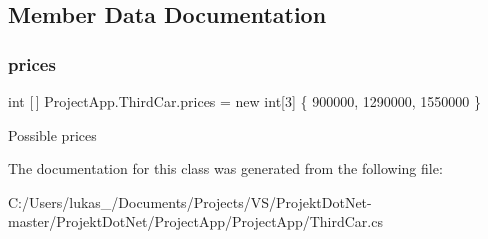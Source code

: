 \subsection{Member Data Documentation}
\mbox{\label{class_project_app_1_1_third_car_a0735e725ed6e06d584e9784bb3e57882}} 
\subsubsection{\texorpdfstring{prices}{prices}}
{\footnotesize\ttfamily int \mbox{[}$\,$\mbox{]} Project\+App.\+Third\+Car.\+prices = new int\mbox{[}3\mbox{]} \{ 900000, 1290000, 1550000 \}}



Possible prices 



The documentation for this class was generated from the following file\+:\begin{DoxyCompactItemize}
\item 
C\+:/\+Users/lukas\+\_/\+Documents/\+Projects/\+V\+S/\+Projekt\+Dot\+Net-\/master/\+Projekt\+Dot\+Net/\+Project\+App/\+Project\+App/Third\+Car.\+cs\end{DoxyCompactItemize}
